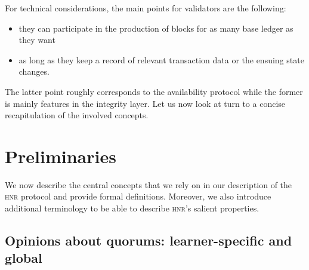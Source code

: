 \documentclass[%
dvipsnames,handout]{article}
\theoremstyle{definition}
\newcommand{\base}[1][ ]{%
  base ledger%
  \ifthenelse{\equal{#1}{ }}{}{#1}
}
\newcommand{\hnr}{\textsc{hnr}\xspace}
\begin{document}
For technical considerations,
the main points for validators are the following:
\begin{itemize}
\item %
  they can participate in the production of blocks for %
  as many \base[s] as they want %
\item %
  as long as they keep a record of relevant %
  transaction data or the ensuing state changes. %
\end{itemize}
The latter point roughly corresponds to the availability protocol %
while the former is mainly features in the integrity layer. %
Let us now look at turn to a concise recapitulation of the involved concepts. %


\section{Preliminaries}
\label{sec:preliminaries}
We now describe the central concepts %
that we rely on in our description of the \hnr protocol %
and provide formal definitions. %
Moreover,
we also introduce additional terminology to be able to describe \hnr's salient properties. %



\subsection{Opinions about quorums: learner-specific and global}
\label{sec:quorum-sets}
\end{document}
